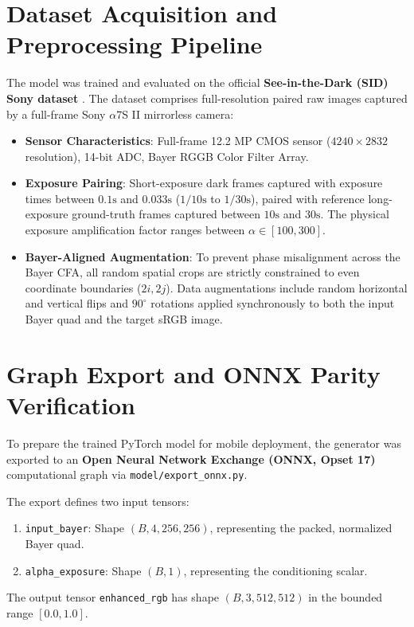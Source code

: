 \section{Dataset Acquisition and Preprocessing Pipeline}
The model was trained and evaluated on the official \textbf{See-in-the-Dark (SID) Sony dataset} \cite{chen2018learning}. The dataset comprises full-resolution paired raw images captured by a full-frame Sony $\alpha$7S II mirrorless camera:
\begin{itemize}
    \item \textbf{Sensor Characteristics}: Full-frame 12.2 MP CMOS sensor ($4240 \times 2832$ resolution), 14-bit ADC, Bayer RGGB Color Filter Array.
    \item \textbf{Exposure Pairing}: Short-exposure dark frames captured with exposure times between $0.1\text{s}$ and $0.033\text{s}$ ($1/10\text{s}$ to $1/30\text{s}$), paired with reference long-exposure ground-truth frames captured between $10\text{s}$ and $30\text{s}$. The physical exposure amplification factor ranges between $\alpha \in [100, 300]$.
    \item \textbf{Bayer-Aligned Augmentation}: To prevent phase misalignment across the Bayer CFA, all random spatial crops are strictly constrained to even coordinate boundaries ($2i, 2j$). Data augmentations include random horizontal and vertical flips and $90^\circ$ rotations applied synchronously to both the input Bayer quad and the target sRGB image.
\end{itemize}

\section{Graph Export and ONNX Parity Verification}
To prepare the trained PyTorch model for mobile deployment, the generator was exported to an \textbf{Open Neural Network Exchange (ONNX, Opset 17)} computational graph via \texttt{model/export\_onnx.py}. 

The export defines two input tensors:
\begin{enumerate}
    \item \texttt{input\_bayer}: Shape $(B, 4, 256, 256)$, representing the packed, normalized Bayer quad.
    \item \texttt{alpha\_exposure}: Shape $(B, 1)$, representing the conditioning scalar.
\end{enumerate}
The output tensor \texttt{enhanced\_rgb} has shape $(B, 3, 512, 512)$ in the bounded range $[0.0, 1.0]$. 

